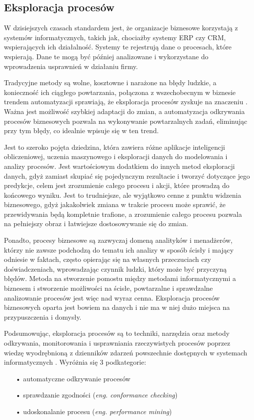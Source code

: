 \subsection{Eksploracja procesów}

W dzisiejszych czasach standardem jest, że organizacje biznesowe korzystają z systemów informatycznych, takich jak, chociażby systemy ERP czy CRM, wspierających ich działalność. Systemy te rejestrują dane o procesach, które wspierają. Dane te mogą być później analizowane i wykorzystane do wprowadzenia usprawnień w działaniu firmy.   

Tradycyjne metody są wolne, kosztowne i narażone na błędy ludzkie, a konieczność ich ciągłego powtarzania, połączona z wszechobecnym w biznesie trendem automatyzacji sprawiają, że eksploracja procesów zyskuje na znaczeniu \cite{market-pm}. Ważna jest możliwość szybkiej adaptacji do zmian, a automatyzacja odkrywania procesów biznesowych pozwala na wykonywanie powtarzalnych zadań, eliminując przy tym błędy, co idealnie wpisuje się w ten trend.

Jest to szeroko pojęta dziedzina, która zawiera różne aplikacje inteligencji obliczeniowej, uczenia maszynowego i eksploracji danych do modelowania i analizy procesów. 
Jest wartościowym dodatkiem do innych metod eksploracji danych, gdyż zamiast skupiać się pojedynczym rezultacie i tworzyć dotyczące jego predykcje, celem jest zrozumienie całego procesu i akcji, które prowadzą do końcowego wyniku. Jest to trudniejsze, ale wyjątkowo cenne z punktu widzenia biznesowego, gdyż jakakolwiek zmiana w trakcie procesu może sprawić, że przewidywania będą kompletnie trafione, a zrozumienie całego procesu pozwala na pełniejszy obraz i łatwiejsze dostosowywanie się do zmian. 

Ponadto, procesy biznesowe są zazwyczaj domeną analityków i menadżerów, którzy nie zawsze podchodzą do tematu ich analizy w sposób ścisły i mający odniesie w faktach, często opierając się na własnych przeczuciach czy doświadczeniach, wprowadzając czynnik ludzki, który może być przyczyną błędów. Metoda na stworzenie pomostu między metodami informatycznymi a biznesem i stworzenie możliwości na ścisłe, powtarzalne i sprawdzalne analizowanie procesów jest więc nad wyraz cenna. Eksploracja procesów biznesowych oparta jest bowiem na danych i nie ma w niej dużo miejsca na przypuszczenia i domysły.

Podsumowując, eksploracja procesów są to techniki, narzędzia oraz metody odkrywania, monitorowania i usprawniania rzeczywistych procesów poprzez wiedzę wyodrębnioną z dzienników zdarzeń powszechnie dostępnych w systemach informatycznych \cite{pm-manifesto}\cite{mining-overview}.
Wyróżnia się 3 podkategorie: 
\begin{itemize}
  \item[•] automatyczne odkrywanie procesów
  \item[•] sprawdzanie zgodności (\textit{eng. conformance checking})
  \item[•] udoskonalanie procesu (\textit{eng. performance mining})
\end{itemize}


